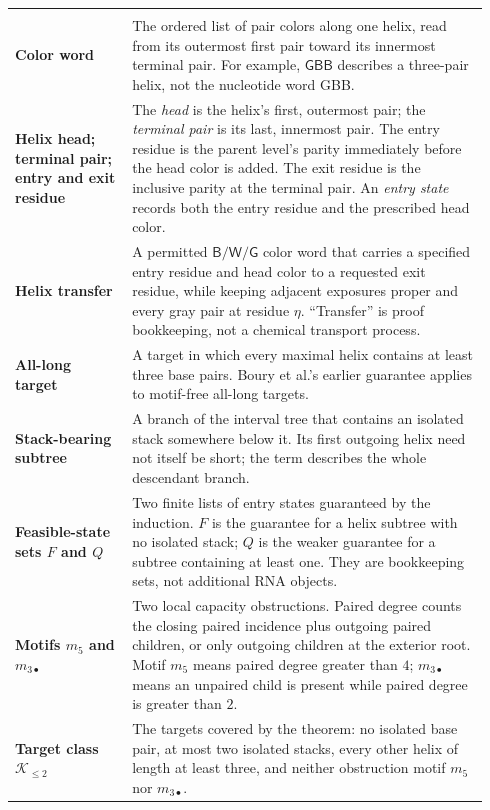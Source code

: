\documentclass[11pt]{article}
\newcommand{\Bcol}{\mathsf{B}}
\newcommand{\Wcol}{\mathsf{W}}
\newcommand{\Gray}{\mathsf{G}}
\newcommand{\Ktwo}{\mathcal{K}_{\le 2}}
\begin{document}
{\begin{longtable}{@{}>{\raggedright\arraybackslash\bfseries}p{0.235\linewidth}>{\raggedright\arraybackslash}p{0.705\linewidth}@{}}
\midrule
\multicolumn{2}{@{}l}{\textcolor{DeepBlue}{\bfseries Terms used in the recursive construction}}\\
\addlinespace[2pt]
Color word & The ordered list of pair colors along one helix, read from its outermost first pair toward its innermost terminal pair.  For example, $\Gray\Bcol\Bcol$ describes a three-pair helix, not the nucleotide word GBB. \\
\addlinespace[3pt]
Helix head; terminal pair; entry and exit residue & The \emph{head} is the helix's first, outermost pair; the \emph{terminal pair} is its last, innermost pair.  The entry residue is the parent level's parity immediately before the head color is added.  The exit residue is the inclusive parity at the terminal pair.  An \emph{entry state} records both the entry residue and the prescribed head color. \\
\addlinespace[3pt]
Helix transfer & A permitted $\Bcol/\Wcol/\Gray$ color word that carries a specified entry residue and head color to a requested exit residue, while keeping adjacent exposures proper and every gray pair at residue $\eta$.  ``Transfer'' is proof bookkeeping, not a chemical transport process. \\
\addlinespace[3pt]
All-long target & A target in which every maximal helix contains at least three base pairs.  Boury et al.'s earlier guarantee applies to motif-free all-long targets. \\
\addlinespace[3pt]
Stack-bearing subtree & A branch of the interval tree that contains an isolated stack somewhere below it.  Its first outgoing helix need not itself be short; the term describes the whole descendant branch. \\
\addlinespace[3pt]
Feasible-state sets $F$ and $Q$ & Two finite lists of entry states guaranteed by the induction.  $F$ is the guarantee for a helix subtree with no isolated stack; $Q$ is the weaker guarantee for a subtree containing at least one.  They are bookkeeping sets, not additional RNA objects. \\
\addlinespace[3pt]
Motifs $m_5$ and $m_{3\bullet}$ & Two local capacity obstructions.  Paired degree counts the closing paired incidence plus outgoing paired children, or only outgoing children at the exterior root.  Motif $m_5$ means paired degree greater than $4$; $m_{3\bullet}$ means an unpaired child is present while paired degree is greater than $2$. \\
\addlinespace[3pt]
Target class $\Ktwo$ & The targets covered by the theorem: no isolated base pair, at most two isolated stacks, every other helix of length at least three, and neither obstruction motif $m_5$ nor $m_{3\bullet}$. \\

\end{longtable}}
\end{document}
